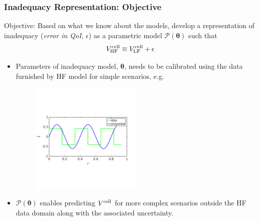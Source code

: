 \documentclass[10pt,xcolor=dvipsnames,compress]{beamer}
\begin{document}
\begin{frame}
\frametitle{Inadequacy Representation: Objective}
\vfill


\begin{alertblock}{Objective:}
Based on what we know about the models, develop a representation of inadequacy (\textit{error in QoI}, $\epsilon$) as a parametric model $\mathcal{P}(\boldsymbol{\theta})$ such that 
\begin{equation*}
V^{\rm cell}_{\rm HF} \equiv  V^{\rm cell}_{\rm LF} + \epsilon
\end{equation*}
\end{alertblock}


\begin{itemize}

\item Parameters of inadequacy model, $\boldsymbol{\theta}$, needs to be calibrated using the data furnished by HF model for simple scenarios, e.g. 

\begin{figure}[h]
    \centering
    \includegraphics[trim = 0.in 2.4in 0.8in 2.8in, clip, width=0.5\textwidth]{figs/I_scenario.png} 
\end{figure}

\vspace{-0.1in}

\item $\mathcal{P}(\boldsymbol{\theta})$ enables predicting $V^{\rm cell}$ for more complex scenarios outside the HF data domain along with the associated uncertainty.

\end{itemize}


\vfill
\end{frame}
\end{document}
